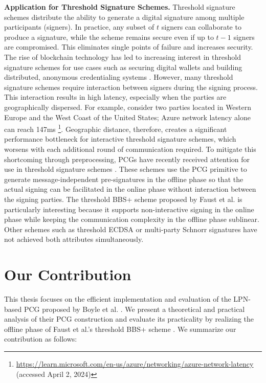 \textbf{Application for Threshold Signature Schemes.}  Threshold signature schemes \cite{desmedt1987society, desmedt1992threshold} distribute the ability to generate a digital signature among multiple participants (signers). In practice, any subset of $t$ signers can collaborate to produce a signature, while the scheme remains secure even if up to $t - 1$ signers are compromised. This eliminates single points of failure and increases security. The rise of blockchain technology has led to increasing interest in threshold signature schemes for use cases such as securing digital wallets \cite{gennaro2016threshold} and building distributed, anonymous credentialing systems \cite{garman2013decentralized}. However, many threshold signature schemes require interaction between signers during the signing process. This interaction results in high latency, especially when the parties are geographically dispersed. For example, consider two parties located in Western Europe and the West Coast of the United States; Azure network latency alone can reach 147ms \footnote{\url{https://learn.microsoft.com/en-us/azure/networking/azure-network-latency} (accessed April 2, 2024)}. Geographic distance, therefore, creates a significant performance bottleneck for interactive threshold signature schemes, which worsens with each additional round of communication required. To mitigate this shortcoming through preprocessing, PCGs have recently received attention for use in threshold signature schemes \cite{abram2022low, faust2023non}. These schemes use the PCG primitive to generate message-independent pre-signatures in the offline phase so that the actual signing can be facilitated in the online phase without interaction between the signing parties. The threshold BBS+ scheme proposed by Faust et al. \cite{faust2023non} is particularly interesting because it supports non-interactive signing in the online phase while keeping the communication complexity in the offline phase sublinear. Other schemes such as threshold ECDSA \cite{abram2022low} or multi-party Schnorr signatures \cite{kondi2023two} have not achieved both attributes simultaneously. 

\section{Our Contribution}
This thesis focuses on the efficient implementation and evaluation of the LPN-based PCG proposed by Boyle et al. \cite{boyle2020efficient}. We present a theoretical and practical analysis of their PCG construction and evaluate its practicality by realizing the offline phase of Faust et al.'s threshold BBS+ scheme \cite{faust2023non}. We summarize our contribution as follows:

